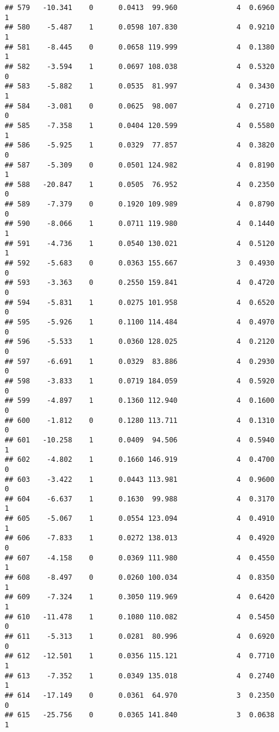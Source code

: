 \documentclass[
]{article}
\begin{document}
\begin{verbatim}
## 579   -10.341    0      0.0413  99.960              4  0.6960      1
## 580    -5.487    1      0.0598 107.830              4  0.9210      1
## 581    -8.445    0      0.0658 119.999              4  0.1380      1
## 582    -3.594    1      0.0697 108.038              4  0.5320      0
## 583    -5.882    1      0.0535  81.997              4  0.3430      1
## 584    -3.081    0      0.0625  98.007              4  0.2710      0
## 585    -7.358    1      0.0404 120.599              4  0.5580      1
## 586    -5.925    1      0.0329  77.857              4  0.3820      0
## 587    -5.309    0      0.0501 124.982              4  0.8190      1
## 588   -20.847    1      0.0505  76.952              4  0.2350      0
## 589    -7.379    0      0.1920 109.989              4  0.8790      0
## 590    -8.066    1      0.0711 119.980              4  0.1440      1
## 591    -4.736    1      0.0540 130.021              4  0.5120      1
## 592    -5.683    0      0.0363 155.667              3  0.4930      0
## 593    -3.363    0      0.2550 159.841              4  0.4720      0
## 594    -5.831    1      0.0275 101.958              4  0.6520      0
## 595    -5.926    1      0.1100 114.484              4  0.4970      0
## 596    -5.533    1      0.0360 128.025              4  0.2120      0
## 597    -6.691    1      0.0329  83.886              4  0.2930      0
## 598    -3.833    1      0.0719 184.059              4  0.5920      0
## 599    -4.897    1      0.1360 112.940              4  0.1600      0
## 600    -1.812    0      0.1280 113.711              4  0.1310      0
## 601   -10.258    1      0.0409  94.506              4  0.5940      1
## 602    -4.802    1      0.1660 146.919              4  0.4700      0
## 603    -3.422    1      0.0443 113.981              4  0.9600      0
## 604    -6.637    1      0.1630  99.988              4  0.3170      1
## 605    -5.067    1      0.0554 123.094              4  0.4910      1
## 606    -7.833    1      0.0272 138.013              4  0.4920      0
## 607    -4.158    0      0.0369 111.980              4  0.4550      1
## 608    -8.497    0      0.0260 100.034              4  0.8350      1
## 609    -7.324    1      0.3050 119.969              4  0.6420      1
## 610   -11.478    1      0.1080 110.082              4  0.5450      0
## 611    -5.313    1      0.0281  80.996              4  0.6920      0
## 612   -12.501    1      0.0356 115.121              4  0.7710      1
## 613    -7.352    1      0.0349 135.018              4  0.2740      1
## 614   -17.149    0      0.0361  64.970              3  0.2350      0
## 615   -25.756    0      0.0365 141.840              3  0.0638      1

\end{verbatim}
\end{document}
